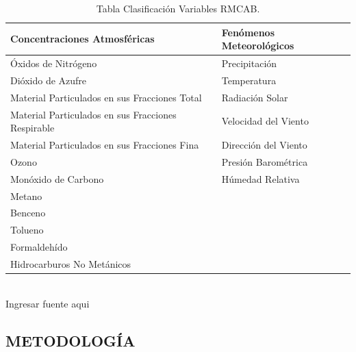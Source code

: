 \documentclass[a4paper,openright,12pt]{book}
\theoremstyle{definition}
\theoremstyle{remark}
\begin{document}
\begin{table}[htbp]
\begin{center}
\caption{Tabla Clasificación Variables RMCAB.}
\resizebox{10cm}{!} {
\begin{tabular}{|l|l|}
\hline
Concentraciones Atmosféricas & Fenómenos  Meteorológicos \\
\hline \hline
Óxidos de Nitrógeno & Precipitación \\ \hline
Dióxido de Azufre & Temperatura \\ \hline
Material Particulados en sus Fracciones Total & Radiación Solar \\ \hline
Material Particulados en sus Fracciones Respirable & Velocidad del Viento \\ \hline
Material Particulados en sus Fracciones Fina & Dirección del Viento \\ \hline
Ozono & Presión Barométrica \\ \hline
Monóxido de Carbono & Húmedad Relativa \\ \hline
Metano &  \\ \hline
Benceno &  \\ \hline
Tolueno &  \\ \hline
Formaldehído &  \\ \hline
Hidrocarburos No Metánicos & \\ \hline
\end{tabular}
}
\label{tabla:variables RMCAB}
\\Ingresar fuente aqui
\end{center}
\end{table}

\begin{center}
\chapter{METODOLOGÍA}\label{cap.metodologia}
%
\end{center}
\end{document}
